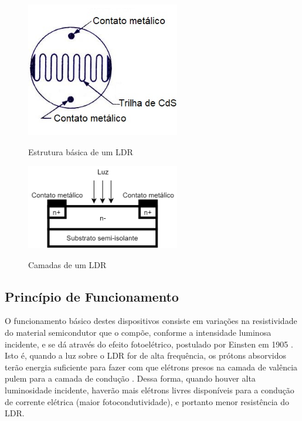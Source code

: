 \documentclass[oneside,openright,12pt]{ufsm_2015} %
\begin{document}
\begin{figure}[H]
    \caption{\label{exepretex} Estrutura básica de um LDR}
    \centering
    \includegraphics[width=0.6\textwidth]{figuras/ldrcds.jpg}
    \vspace{\baselineskip} %
        \label{fig:ldrstructure}
\end{figure}

\begin{figure}[H]
    \caption{\label{exepretex} Camadas de um LDR}
    \centering
    \includegraphics[width=0.6\textwidth]{figuras/ldr_esturtura.png}
    \vspace{\baselineskip} %
        \label{fig:substrato}
\end{figure}

\subsection{Princípio de Funcionamento}
O funcionamento básico destes dispositivos consiste em variações na resistividade do material semicondutor que o compõe, conforme a intensidade luminosa incidente, e se dá através do efeito fotoelétrico,  postulado por Einsten em 1905 \cite{klassen2011photoelectric}. Isto é, quando a luz sobre o LDR for de alta frequência, os prótons absorvidos terão energia suficiente para fazer com que elétrons presos na camada de valência pulem para a camada de condução \cite{ibrahim2016automated}. Dessa forma, quando houver alta luminosidade incidente, haverão mais elétrons livres disponíveis para a condução de corrente elétrica (maior fotocondutividade), e portanto menor resistência do LDR.
\end{document}
